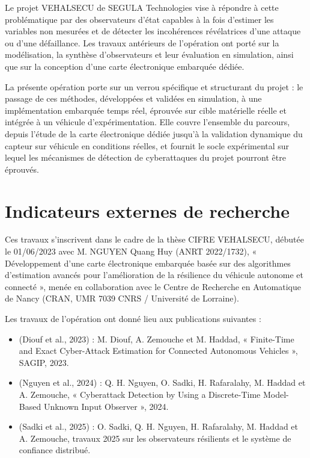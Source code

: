 \documentclass[11pt,a4paper]{article}
\begin{document}
Le projet VEHALSECU de SEGULA Technologies vise à répondre à cette problématique par des observateurs d’état capables à la fois d’estimer les variables non mesurées et de détecter les incohérences révélatrices d’une attaque ou d’une défaillance. Les travaux antérieurs de l’opération ont porté sur la modélisation, la synthèse d’observateurs et leur évaluation en simulation, ainsi que sur la conception d’une carte électronique embarquée dédiée.

La présente opération porte sur un verrou spécifique et structurant du projet : le passage de ces méthodes, développées et validées en simulation, à une implémentation embarquée temps réel, éprouvée sur cible matérielle réelle et intégrée à un véhicule d’expérimentation. Elle couvre l’ensemble du parcours, depuis l’étude de la carte électronique dédiée jusqu’à la validation dynamique du capteur sur véhicule en conditions réelles, et fournit le socle expérimental sur lequel les mécanismes de détection de cyberattaques du projet pourront être éprouvés.

\section{Indicateurs externes de recherche}

Ces travaux s’inscrivent dans le cadre de la thèse CIFRE VEHALSECU, débutée le 01/06/2023 avec M. NGUYEN Quang Huy (ANRT 2022/1732), « Développement d’une carte électronique embarquée basée sur des algorithmes d’estimation avancés pour l’amélioration de la résilience du véhicule autonome et connecté », menée en collaboration avec le Centre de Recherche en Automatique de Nancy (CRAN, UMR 7039 CNRS / Université de Lorraine).

Les travaux de l’opération ont donné lieu aux publications suivantes :

\begin{itemize}
\item (Diouf et al., 2023) : M. Diouf, A. Zemouche et M. Haddad, « Finite-Time and Exact Cyber-Attack Estimation for Connected Autonomous Vehicles », SAGIP, 2023.
\item (Nguyen et al., 2024) : Q. H. Nguyen, O. Sadki, H. Rafaralahy, M. Haddad et A. Zemouche, « Cyberattack Detection by Using a Discrete-Time Model-Based Unknown Input Observer », 2024.
\item (Sadki et al., 2025) : O. Sadki, Q. H. Nguyen, H. Rafaralahy, M. Haddad et A. Zemouche, travaux 2025 sur les observateurs résilients et le système de confiance distribué.
\end{itemize}
\end{document}
